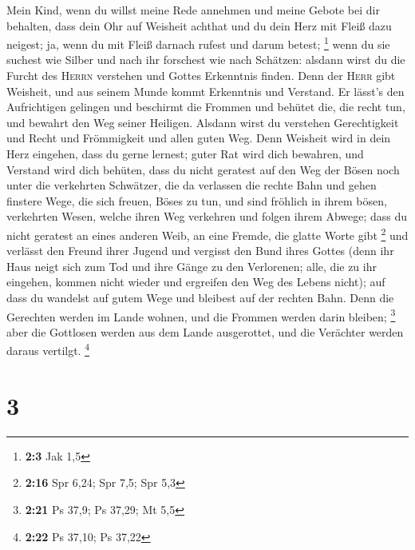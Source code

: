  Mein Kind, wenn du willst meine Rede annehmen und meine
Gebote bei dir behalten,  dass dein Ohr auf Weisheit
achthat und du dein Herz mit Fleiß dazu neigest;  ja, wenn
du mit Fleiß darnach rufest und darum betest; \footnote{\textbf{2:3} Jak
  1,5}  wenn du sie suchest wie Silber und nach ihr
forschest wie nach Schätzen:  alsdann wirst du die Furcht
des \textsc{Herrn} verstehen und Gottes Erkenntnis finden.
 Denn der \textsc{Herr} gibt Weisheit, und aus seinem
Munde kommt Erkenntnis und Verstand.  Er lässt's den
Aufrichtigen gelingen und beschirmt die Frommen  und
behütet die, die recht tun, und bewahrt den Weg seiner Heiligen.
 Alsdann wirst du verstehen Gerechtigkeit und Recht und
Frömmigkeit und allen guten Weg.  Denn Weisheit wird in
dein Herz eingehen, dass du gerne lernest;  guter Rat
wird dich bewahren, und Verstand wird dich behüten,  dass
du nicht geratest auf den Weg der Bösen noch unter die verkehrten
Schwätzer,  die da verlassen die rechte Bahn und gehen
finstere Wege,  die sich freuen, Böses zu tun, und sind
fröhlich in ihrem bösen, verkehrten Wesen,  welche ihren
Weg verkehren und folgen ihrem Abwege;  dass du nicht
geratest an eines anderen Weib, an eine Fremde, die glatte Worte gibt
\footnote{\textbf{2:16} Spr 6,24; Spr 7,5; Spr 5,3}  und
verlässt den Freund ihrer Jugend und vergisst den Bund ihres Gottes
 (denn ihr Haus neigt sich zum Tod und ihre Gänge zu den
Verlorenen;  alle, die zu ihr eingehen, kommen nicht
wieder und ergreifen den Weg des Lebens nicht);  auf dass
du wandelst auf gutem Wege und bleibest auf der rechten Bahn.
 Denn die Gerechten werden im Lande wohnen, und die
Frommen werden darin bleiben; \footnote{\textbf{2:21} Ps 37,9; Ps 37,29;
  Mt 5,5}  aber die Gottlosen werden aus dem Lande
ausgerottet, und die Verächter werden daraus vertilgt. \footnote{\textbf{2:22}
  Ps 37,10; Ps 37,22}

\hypertarget{section-2}{%
\section{3}\label{section-2}}

